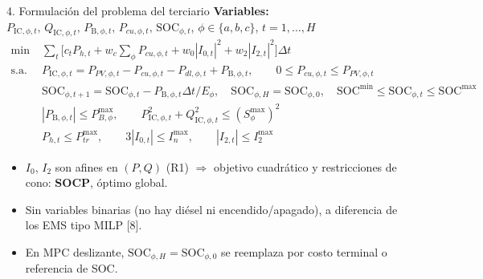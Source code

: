 \documentclass[aspectratio=169,10pt,t]{beamer}
\newcommand{\Pic}[1]{P_{\mathrm{IC},#1}}
\newcommand{\Qic}[1]{Q_{\mathrm{IC},#1}}
\newcommand{\PB}[1]{P_{\mathrm{B},#1}}
\newcommand{\SOC}[1]{\mathrm{SOC}_{#1}}
\begin{document}
\begin{frame}{4. Formulación del problema del terciario}
  \footnotesize
  \textbf{Variables:} $\Pic{\phi,t},\,\Qic{\phi,t},\,\PB{\phi,t},\,P_{cu,\phi,t},\,\SOC{\phi,t}$, \;$\phi\in\{a,b,c\}$, $t=1,\dots,H$
  \begin{align*}
    \min\;& \textstyle\sum_t\Big[c_t P_{h,t}+w_c\sum_\phi P_{cu,\phi,t}+w_0|I_{0,t}|^2+w_2|I_{2,t}|^2\Big]\Delta t\\
    \text{s.a.}\;& \Pic{\phi,t}=P_{PV,\phi,t}-P_{cu,\phi,t}-P_{dl,\phi,t}+\PB{\phi,t},\qquad 0\le P_{cu,\phi,t}\le P_{PV,\phi,t}\\
    & \SOC{\phi,t+1}=\SOC{\phi,t}-\PB{\phi,t}\Delta t/E_\phi,\quad \SOC{\phi,H}=\SOC{\phi,0},\quad \mathrm{SOC}^{\min}\le\SOC{\phi,t}\le\mathrm{SOC}^{\max}\\
    & |\PB{\phi,t}|\le P_{B,\phi}^{\max},\qquad \Pic{\phi,t}^2+\Qic{\phi,t}^2\le (S_\phi^{\max})^2\\
    & P_{h,t}\le P_{tr}^{\max},\qquad 3|I_{0,t}|\le I_n^{\max},\qquad |I_{2,t}|\le I_2^{\max}
  \end{align*}
  \vspace{-4pt}
  \begin{itemize}\setlength\itemsep{2pt}
    \item $I_0$, $I_2$ son afines en $(P,Q)$ (R1) $\Rightarrow$ objetivo cuadrático y restricciones de cono: \textbf{SOCP}, óptimo global.
    \item Sin variables binarias (no hay diésel ni encendido/apagado), a diferencia de los EMS tipo MILP [8].
    \item En MPC deslizante, $\SOC{\phi,H}=\SOC{\phi,0}$ se reemplaza por costo terminal o referencia de SOC.
  \end{itemize}
  \end{frame}
\end{document}
